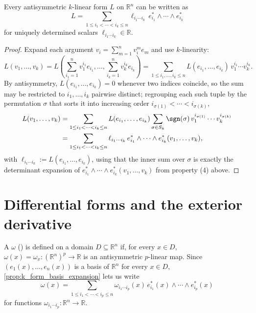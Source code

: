 \begin{proposition}
\label{prop:k_form_basis_expansion}
Every antisymmetric $k$-linear form $L$ on $\mathbb{R}^n$ can be written as
\[L = \sum_{1\leq i_1<\cdots<i_k\leq n} \ell_{i_1\cdots i_k}\,e_{i_1}^*\wedge\cdots\wedge
  e_{i_k}^*\]
for uniquely determined scalars $\ell_{i_1\cdots i_k} \in \mathbb{R}$.
\end{proposition}

\begin{proof}
Expand each argument $v_i = \sum_{m=1}^n v_i^m e_m$ and use $k$-linearity:
\[L(v_1,\ldots,v_k) = L\!\left(\sum_{i_1=1}^n v_1^{i_1}e_{i_1},\ldots,\sum_{i_k=1}^n
  v_k^{i_k}e_{i_k}\right) = \sum_{1\leq i_1,\ldots,i_k\leq n} L(e_{i_1},\ldots,e_{i_k})\,
  v_1^{i_1}\cdots v_k^{i_k}.\]
By antisymmetry, $L(e_{i_1},\ldots,e_{i_k}) = 0$ whenever two indices coincide, so the sum may
be restricted to $i_1,\ldots,i_k$ pairwise distinct; regrouping each such tuple by the
permutation $\sigma$ that sorts it into increasing order $i_{\sigma(1)}<\cdots<i_{\sigma(k)}$,
\begin{align}
L(v_1,\ldots,v_k) &= \sum_{1\leq i_1<\cdots<i_k\leq n} L(e_{i_1},\ldots,e_{i_k})
  \sum_{\sigma\in S_k} \sgn(\sigma)\,v_1^{i_{\sigma(1)}}\cdots v_k^{i_{\sigma(k)}} \nonumber \\
  &= \sum_{1\leq i_1<\cdots<i_k\leq n} \ell_{i_1\cdots i_k}\,e_{i_1}^*\wedge\cdots\wedge
  e_{i_k}^*(v_1,\ldots,v_k), \nonumber
\end{align}
with $\ell_{i_1\cdots i_k} := L(e_{i_1},\ldots,e_{i_k})$, using that the inner sum over $\sigma$
is exactly the determinant expansion of $e_{i_1}^*\wedge\cdots\wedge e_{i_k}^*(v_1,\ldots,v_k)$
from property (4) above.
\end{proof}

\section{Differential forms and the exterior derivative}
\label{sec:differential_forms}

\begin{definition}
\label{def:differential_p_form}
A  $\omega$ () is defined on a
domain $D \subseteq \mathbb{R}^n$ if, for every $x \in D$, $\omega(x) = \omega_x : (\mathbb{R}^n)^p
\to \mathbb{R}$ is an antisymmetric $p$-linear map. Since $(e_1(x),\ldots,e_n(x))$ is a basis
of $\mathbb{R}^n$ for every $x \in D$, \cref{prop:k_form_basis_expansion} lets us write
\[\omega(x) = \sum_{1\leq i_1<\cdots<i_p\leq n} \omega_{i_1\cdots i_p}(x)\,e_{i_1}^*(x)\wedge
  \cdots\wedge e_{i_p}^*(x)\]
for functions $\omega_{i_1\cdots i_p} : \mathbb{R}^n \to \mathbb{R}$.
\end{definition}

